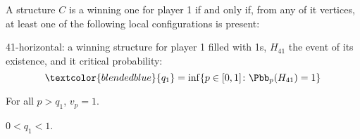\documentclass[11pt, mathserif]{beamer}
\begin{document}
    \begin{frame}
        \begin{proposition}\label{rigtht-structure-player1-game2}
            A structure $C$ is a winning one for player 1 if and only if, from any of it vertices, at least one of the following local configurations is present: 
            \begin{center}
            \end{center}
        \end{proposition} 

        \vspace{0.5cm}
        \textcolor{blendedblue}{41-horizontal}: a winning structure for player 1 filled with 1s, \textcolor{blendedblue}{$H_{41}$} the event of its existence, and it critical probability:
        \[
          \textcolor{blendedblue}{q_1} = \inf\{p \in [0, 1] \colon \Pbb_p(H_{41}) = 1\}
        \]
    \end{frame}

    \begin{frame}
        \begin{theorem}\label{conjecture-v0-p0}
            For all $p > q_1$, $v_p = 1$.
        \end{theorem}



        \pause
        \begin{theorem}\label{theorem-q0}
            $0 < q_1 < 1$.
        \end{theorem}
    \end{frame}
\end{document}
